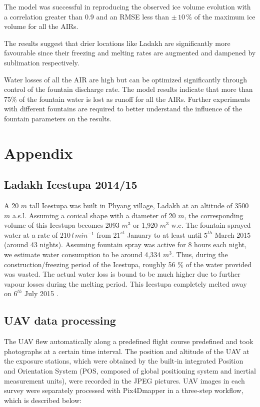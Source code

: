 \documentclass[utf8]{frontiersSCNS} %
\begin{document}
The model was successful in reproducing the observed ice volume evolution with a correlation greater than 0.9 and
an RMSE less than $\pm \, 10 \, \%$ of the maximum ice volume for all the AIRs.

The results suggest that drier locations like Ladakh are significantly more favourable since their freezing and
melting rates are augmented and dampened by sublimation respectively.

Water losses of all the AIR are high but can be optimized significantly through control of the fountain discharge
rate.  The model results indicate that more than 75\% of the fountain water is lost as runoff for all the AIRs.
Further experiments with different fountains are required to better understand the influence of the fountain
parameters on the results.

\section{Appendix}

\subsection{Ladakh Icestupa 2014/15} \label{sec:ladakhloss}

A 20 $m$ tall Icestupa \citep{iceheight} was built in Phyang village, Ladakh at an altitude of 3500 $m$ a.s.l.
Assuming a conical shape with a diameter of 20 $m$, the corresponding volume of this Icestupa becomes 2093 $m^3$ or
1,920 $m^3$ w.e. The fountain sprayed water at a rate of $210\, l\,min^{-1}$ \citep{waterinput} from $21^{st}$
January \citep{waterstart} to at least until $5^{th}$ March 2015 \citep{waterend} (around 43 nights). Assuming
fountain spray was active for 8 hours each night, we estimate water consumption to be around 4,334 $m^3$. Thus,
during the construction/freezing period of the Icestupa, roughly 56 \% of the water provided was wasted. The actual
water loss is bound to be much higher due to further vapour losses during the melting period. This Icestupa
completely melted away on $6^{th}$ July 2015 \citep{iceends}.

\subsection{UAV data processing} \label{sec:uav}
The UAV flew automatically along a predefined flight course predefined and took photographs at a certain time interval. The position and
altitude of the UAV at the exposure stations, which were obtained by the built-in integrated Position and
Orientation System (POS, composed of global positioning system and inertial measurement units), were recorded in
the JPEG pictures. UAV images in each survey were separately processed with Pix4Dmapper in a three-step workflow,
which is described below:
\end{document}
